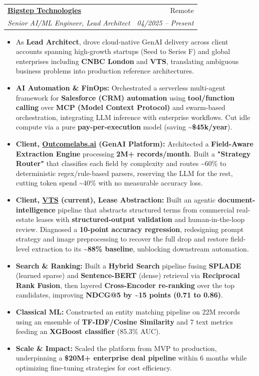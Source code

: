 \documentclass[11pt,a4paper]{article}
\makeatletter
\newcommand{\resumeItem}[1]{
  \item\small{
    {#1 \vspace{-2pt}}
  }
}
\newcommand{\resumeSubheading}[4]{
  \vspace{-1pt}\item
    \begin{tabular*}{0.97\textwidth}[t]{l@{\extracolsep{\fill}}r}
      \textbf{#1} & #2 \\
      \textit{\small#3} & \textit{\small #4} \\
    \end{tabular*}\vspace{-5pt}
}
\newcommand{\resumeItemListStart}{\begin{itemize}[itemsep=2pt, topsep=0pt, partopsep=0pt]}
\newcommand{\resumeItemListEnd}{\end{itemize}\vspace{-5pt}}
\makeatother
\begin{document}
    \resumeSubheading
      {\href{https://bigsteptech.com/}{Bigstep Technologies}}{Remote}
      {Senior AI/ML Engineer, Lead Architect}{04/2025 -- Present}
      \resumeItemListStart
        \resumeItem{As \textbf{Lead Architect}, drove cloud-native GenAI delivery across client accounts spanning high-growth startups (Seed to Series F) and global enterprises including \textbf{CNBC London} and \textbf{VTS}, translating ambiguous business problems into production reference architectures.}
        \resumeItem{\textbf{AI Automation \& FinOps:} Orchestrated a serverless multi-agent framework for \textbf{Salesforce (CRM) automation} using \textbf{tool/function calling} over \textbf{MCP (Model Context Protocol)} and swarm-based orchestration, integrating LLM inference with enterprise workflows. Cut idle compute via a pure \textbf{pay-per-execution} model (saving \textbf{\textasciitilde{}\$45k/year}).}
        \resumeItem{\textbf{Client, \href{https://www.outcomelabs.ai/}{Outcomelabs.ai} (GenAI Platform):} Architected a \textbf{Field-Aware Extraction Engine} processing \textbf{2M+ records/month}. Built a \textbf{"Strategy Router"} that classifies each field by complexity and routes \textasciitilde{}60\% to deterministic regex/rule-based parsers, reserving the LLM for the rest, cutting token spend \textasciitilde{}40\% with no measurable accuracy loss.}
        \resumeItem{\textbf{Client, \href{https://www.vts.com/}{VTS} (current), Lease Abstraction:} Built an agentic \textbf{document-intelligence} pipeline that abstracts structured terms from commercial real-estate leases with \textbf{structured-output validation} and human-in-the-loop review. Diagnosed a \textbf{10-point accuracy regression}, redesigning prompt strategy and image preprocessing to recover the full drop and restore field-level extraction to its \textbf{\textasciitilde{}88\% baseline}, unblocking downstream automation.}
        \resumeItem{\textbf{Search \& Ranking:} Built a \textbf{Hybrid Search} pipeline fusing \textbf{SPLADE} (learned sparse) and \textbf{Sentence-BERT} (dense) retrieval via \textbf{Reciprocal Rank Fusion}, then layered \textbf{Cross-Encoder re-ranking} over the top candidates, improving \textbf{NDCG@5 by \textasciitilde{}15 points (0.71 to 0.86)}.}
        \resumeItem{\textbf{Classical ML:} Constructed an entity matching pipeline on 22M records using an ensemble of \textbf{TF-IDF/Cosine Similarity} and 7 text metrics feeding an \textbf{XGBoost classifier} (85.3\% AUC).}
        \resumeItem{\textbf{Scale \& Impact:} Scaled the platform from MVP to production, underpinning a \textbf{\$20M+ enterprise deal pipeline} within 6 months while optimizing fine-tuning strategies for cost efficiency.}
      \resumeItemListEnd
\end{document}
